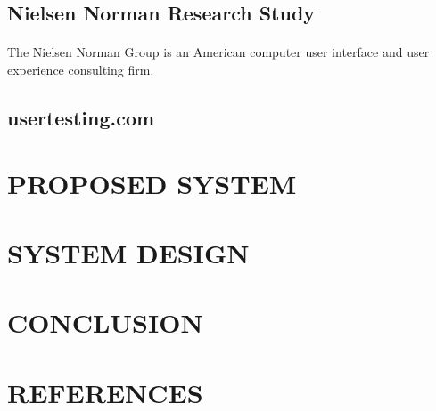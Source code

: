 \documentclass[a4paper,12pt,oneside]{article}
\begin{document}
\subsection{Nielsen Norman Research Study}
\paragraph{}
The Nielsen Norman Group is an American computer user  interface and user experience consulting firm.
\subsection{usertesting.com}

\newpage
\section{PROPOSED SYSTEM}
\paragraph{}


\newpage
\section{SYSTEM DESIGN}




\newpage
\section{CONCLUSION}
\paragraph{}


\newpage

\section{REFERENCES}
\begin{thebibliography}{9}



\end{thebibliography}
\end{document}
